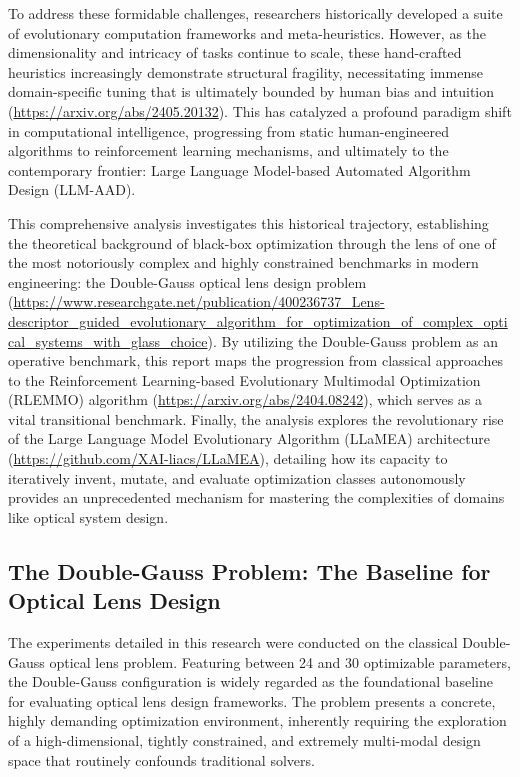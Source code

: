 \documentclass[12pt]{article}
\begin{document}
To address these formidable challenges, researchers historically developed a suite of evolutionary computation frameworks and meta-heuristics. However, as the dimensionality and intricacy of tasks continue to scale, these hand-crafted heuristics increasingly demonstrate structural fragility, necessitating immense domain-specific tuning that is ultimately bounded by human bias and intuition (\url{https://arxiv.org/abs/2405.20132}). This has catalyzed a profound paradigm shift in computational intelligence, progressing from static human-engineered algorithms to reinforcement learning mechanisms, and ultimately to the contemporary frontier: Large Language Model-based Automated Algorithm Design (LLM-AAD).

This comprehensive analysis investigates this historical trajectory, establishing the theoretical background of black-box optimization through the lens of one of the most notoriously complex and highly constrained benchmarks in modern engineering: the Double-Gauss optical lens design problem (\url{https://www.researchgate.net/publication/400236737_Lens-descriptor_guided_evolutionary_algorithm_for_optimization_of_complex_optical_systems_with_glass_choice}). By utilizing the Double-Gauss problem as an operative benchmark, this report maps the progression from classical approaches to the Reinforcement Learning-based Evolutionary Multimodal Optimization (RLEMMO) algorithm (\url{https://arxiv.org/abs/2404.08242}), which serves as a vital transitional benchmark. Finally, the analysis explores the revolutionary rise of the Large Language Model Evolutionary Algorithm (LLaMEA) architecture (\url{https://github.com/XAI-liacs/LLaMEA}), detailing how its capacity to iteratively invent, mutate, and evaluate optimization classes autonomously provides an unprecedented mechanism for mastering the complexities of domains like optical system design.

\subsection{The Double-Gauss Problem: The Baseline for Optical Lens Design}

The experiments detailed in this research were conducted on the classical Double-Gauss optical lens problem. Featuring between 24 and 30 optimizable parameters, the Double-Gauss configuration is widely regarded as the foundational baseline for evaluating optical lens design frameworks. The problem presents a concrete, highly demanding optimization environment, inherently requiring the exploration of a high-dimensional, tightly constrained, and extremely multi-modal design space that routinely confounds traditional solvers.
\end{document}

